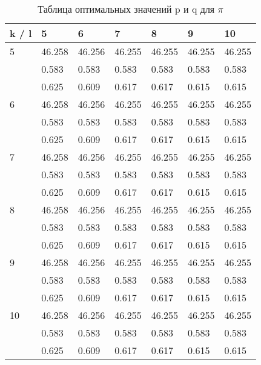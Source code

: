 \documentclass[12pt]{article}
\begin{document}
\begin{table}[h]
\caption{Таблица оптимальных значений p и q для $\pi$}
\label{pitable}
\begin{center}
\begin{tabular}{|l|l|l|l|l|l|l|}
	\hline
	k / l &5 & 6 & 7 & 8 & 9 & 10\\
	\hline
	5 & 46.258& 46.256& 46.255& 46.255& 46.255& 46.255\\
	& 0.583& 0.583& 0.583& 0.583& 0.583& 0.583\\
	& 0.625& 0.609& 0.617& 0.617& 0.615& 0.615\\
	\hline
	6 & 46.258& 46.256& 46.255& 46.255& 46.255& 46.255\\
	& 0.583& 0.583& 0.583& 0.583& 0.583& 0.583\\
	& 0.625& 0.609& 0.617& 0.617& 0.615& 0.615\\
	\hline
	7 & 46.258& 46.256& 46.255& 46.255& 46.255& 46.255\\
	& 0.583& 0.583& 0.583& 0.583& 0.583& 0.583\\
	& 0.625& 0.609& 0.617& 0.617& 0.615& 0.615\\
	\hline
	8 & 46.258& 46.256& 46.255& 46.255& 46.255& 46.255\\
	& 0.583& 0.583& 0.583& 0.583& 0.583& 0.583\\
	& 0.625& 0.609& 0.617& 0.617& 0.615& 0.615\\
	\hline
	9 & 46.258& 46.256& 46.255& 46.255& 46.255& 46.255\\
	& 0.583& 0.583& 0.583& 0.583& 0.583& 0.583\\
	& 0.625& 0.609& 0.617& 0.617& 0.615& 0.615\\
	\hline
	10 & 46.258& 46.256& 46.255& 46.255& 46.255& 46.255\\
	& 0.583& 0.583& 0.583& 0.583& 0.583& 0.583\\
	& 0.625& 0.609& 0.617& 0.617& 0.615& 0.615\\
	\hline
\end{tabular}
\end{center}
\end{table}

	
\tableofcontents
\end{document}
